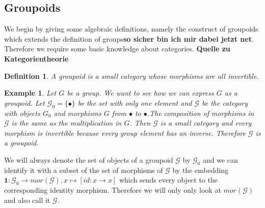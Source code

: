 \documentclass[12pt,a4paper]{scrartcl}
\newtheorem{Definition}[Theorem]{Definition}
\newtheorem{Example}[Theorem]{Example}
\numberwithin{equation}{section}
\newcommand{\2}{\mathbb{Z} / 2 \mathbb{Z}}
\begin{document}
\subsection{Groupoids}
We begin by giving some algebraic definitions, namely the construct of groupoids which extends the definition of groups\textbf{so sicher bin ich mir dabei jetzt net}. Therefore we require some basic knowledge about categories. \textbf{Quelle zu Kategorientheorie}
\begin{Definition}
	A groupoid is a small category whose morphisms are all invertible.
\end{Definition}
\begin{Example} \label{group}
	Let $G$ be a group. We want to see how we can express $G$ as a groupoid. Let $\mathcal{G}_0 = \{\bullet\}$ be the set with only one element  and $\mathcal{G}$ be the category with objects $G_0$ and morphisms $G$ from $\bullet$ to $\bullet$.The composition of morphisms in $\mathcal{G}$ is the same as the multiplication in $G$. Then $\mathcal{G}$ is a small category and every morphism is invertible because every group element has an inverse. Therefore $\mathcal{G}$ is a groupoid.
\end{Example}
We will always denote the set of objects of a groupoid $\mathcal{G}$ by $\mathcal{G}_0$ and we can identify it with a subset of the set of morphisms of $\mathcal{G}$ by the embedding $\textbf{1}: \mathcal{G}_0 \to mor(\mathcal{G}), x \mapsto [id: x \to x]$ which sends every object to the corresponding identity morphism. Therefore we will only only look at $mor(\mathcal{G})$ and also call it $\mathcal{G}$. 
\end{document}
